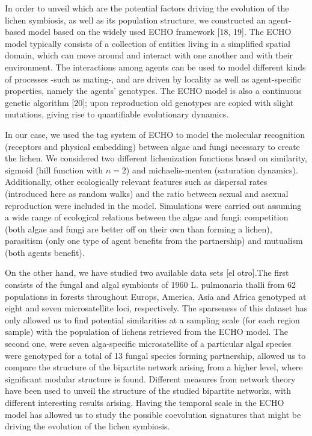 In order to unveil which are the potential factors driving the evolution of the lichen symbiosis, as well as its population structure, we constructed an agent-based model based on the widely used ECHO framework [18, 19]. The ECHO model typically consists of a collection of entities living in a simplified spatial domain, which can move around and interact with one another and with their environment. The interactions among agents can be used to model different kinds of processes -such as mating-, and are driven by locality as well as agent-specific properties, namely the agents' genotypes. The ECHO model is also a continuous genetic algorithm  [20]; upon reproduction old genotypes are copied with slight mutations, giving rise to quantifiable evolutionary dynamics.

In our case, we used the tag system of ECHO to model the molecular recognition (receptors and physical embedding) between algae and fungi necessary to create the lichen. We considered two different lichenization functions based on similarity, sigmoid (hill function with $n=2$) and michaelis-menten (saturation dynamics). Additionally, other ecologically relevant features such as dispersal rates (introduced here as random walks) and the ratio between sexual and asexual reproduction were included in the model. Simulations were carried out assuming a wide range of ecological relations between the algae and fungi: competition (both algae and fungi are better off on their own than forming a lichen), parasitism (only one type of agent benefits from the partnership) and mutualism (both agents benefit).

On the other hand, we have studied two available data sets \cite{dalgrande2012verticalandhorizontalphotobionttransmissionwithinpopulationsofalichensymbiosis}[el otro].The first consists of the fungal and algal symbionts of 1960 L. pulmonaria thalli from 62 populations in forests throughout Europs, America, Asia and Africa genotyped at eight and seven microsatellite loci, respectively. The sparseness of this dataset has only allowed us to find potential similarities at a sampling scale (for each region sample) with the population of lichens retrieved from the ECHO model. The second one, were seven alga-specific microsatellite of a particular algal species were genotyped for a total of 13 fungal species forming partnership, allowed us to compare the structure of the bipartite network arising from a higher level, where significant modular structure is found. Different measures from network theory have been used to unveil the structure of the studied bipartite networks, with different interesting results arising. Having the temporal scale in the ECHO model has allowed us to study the possible coevolution signatures that might be driving the evolution of the lichen symbiosis. 


